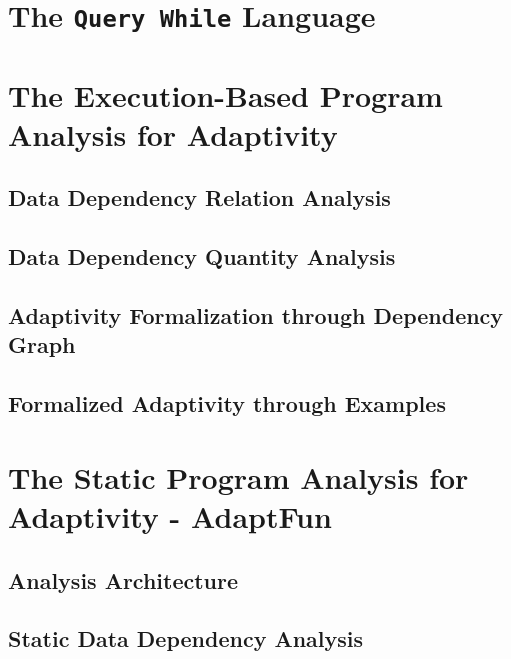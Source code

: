 \documentclass[12pt, letterpaper]{report}   %
\newcommand{\THESYSTEM}{\textsf{AdaptFun}}
\begin{document}
\section{The {\tt Query While} Language}
\label{sec:adapt-language}


\clearpage
\section{The Execution-Based Program Analysis for Adaptivity}
\label{sec:adapt-exe}


\subsection{Data Dependency Relation Analysis}
\label{sec:dynamic-datadep}


\subsection{Data Dependency Quantity Analysis}
\label{sec:dynamic-reachability}
%

\subsection{Adaptivity Formalization through Dependency Graph}
\label{sec:dynamic-adapt}
%
%
\subsection{Formalized Adaptivity through Examples}
\label{sec:dynamic-examples}
%


\clearpage
\section{The Static Program Analysis for Adaptivity - {\THESYSTEM}}
\label{sec:adapt-static}


\subsection{Analysis Architecture}
\label{sec:static-overview}


\subsection{Static Data Dependency Analysis}
\label{sec:static-dep}
% 

\end{document}
